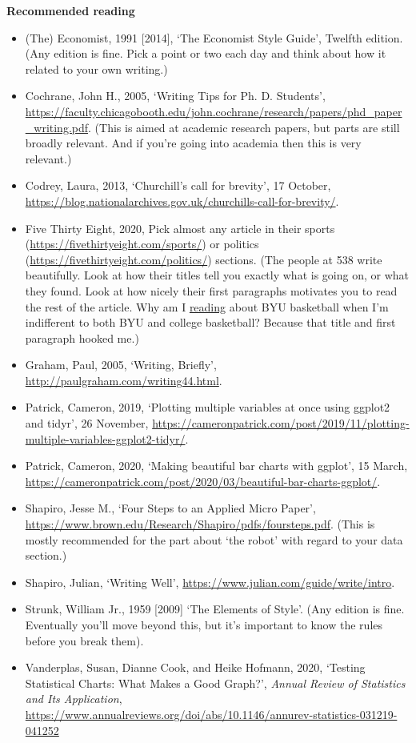 \documentclass[
]{book}
\providecommand{\tightlist}{%
  \setlength{\itemsep}{0pt}\setlength{\parskip}{0pt}}
\begin{document}
\textbf{Recommended reading}

\begin{itemize}
\tightlist
\item
  (The) Economist, 1991 {[}2014{]}, `The Economist Style Guide', Twelfth edition. (Any edition is fine. Pick a point or two each day and think about how it related to your own writing.)
\item
  Cochrane, John H., 2005, `Writing Tips for Ph. D. Students', \url{https://faculty.chicagobooth.edu/john.cochrane/research/papers/phd_paper_writing.pdf}. (This is aimed at academic research papers, but parts are still broadly relevant. And if you're going into academia then this is very relevant.)
\item
  Codrey, Laura, 2013, `Churchill's call for brevity', 17 October, \url{https://blog.nationalarchives.gov.uk/churchills-call-for-brevity/}.
\item
  Five Thirty Eight, 2020, Pick almost any article in their sports (\url{https://fivethirtyeight.com/sports/}) or politics (\url{https://fivethirtyeight.com/politics/}) sections. (The people at 538 write beautifully. Look at how their titles tell you exactly what is going on, or what they found. Look at how nicely their first paragraphs motivates you to read the rest of the article. Why am I \href{https://fivethirtyeight.com/features/byu-is-scorching-the-nets-from-even-farther-back/}{reading} about BYU basketball when I'm indifferent to both BYU and college basketball? Because that title and first paragraph hooked me.)
\item
  Graham, Paul, 2005, `Writing, Briefly', \url{http://paulgraham.com/writing44.html}.
\item
  Patrick, Cameron, 2019, `Plotting multiple variables at once using ggplot2 and tidyr', 26 November, \url{https://cameronpatrick.com/post/2019/11/plotting-multiple-variables-ggplot2-tidyr/}.
\item
  Patrick, Cameron, 2020, `Making beautiful bar charts with ggplot', 15 March, \url{https://cameronpatrick.com/post/2020/03/beautiful-bar-charts-ggplot/}.
\item
  Shapiro, Jesse M., `Four Steps to an Applied Micro Paper', \url{https://www.brown.edu/Research/Shapiro/pdfs/foursteps.pdf}. (This is mostly recommended for the part about `the robot' with regard to your data section.)
\item
  Shapiro, Julian, `Writing Well', \url{https://www.julian.com/guide/write/intro}.
\item
  Strunk, William Jr., 1959 {[}2009{]} `The Elements of Style'. (Any edition is fine. Eventually you'll move beyond this, but it's important to know the rules before you break them).
\item
  Vanderplas, Susan, Dianne Cook, and Heike Hofmann, 2020, `Testing Statistical Charts: What Makes a Good Graph?', \emph{Annual Review of Statistics and Its Application}, \url{https://www.annualreviews.org/doi/abs/10.1146/annurev-statistics-031219-041252}
\end{itemize}
\end{document}
